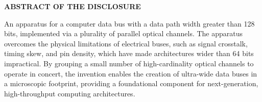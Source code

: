 \documentclass[11pt,letterpaper]{article}
\begin{document}
\thispagestyle{empty}

\begin{center}
    \textbf{\large ABSTRACT OF THE DISCLOSURE}
\end{center}

\vspace{0.6cm}

An apparatus for a computer data bus with a data path width greater than 128 bits, implemented via a plurality of parallel optical channels. The apparatus overcomes the physical limitations of electrical buses, such as signal crosstalk, timing skew, and pin density, which have made architectures wider than 64 bits impractical. By grouping a small number of high-cardinality optical channels to operate in concert, the invention enables the creation of ultra-wide data buses in a microscopic footprint, providing a foundational component for next-generation, high-throughput computing architectures.
\end{document}
